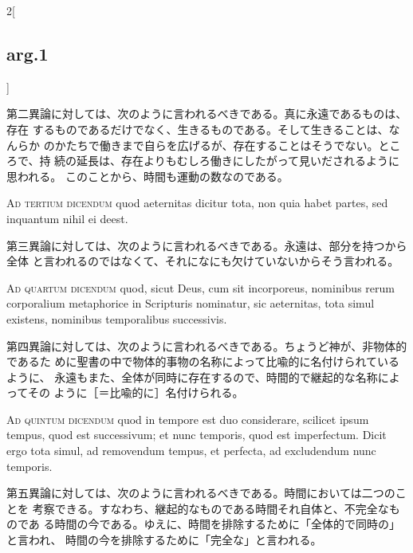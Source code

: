 \documentclass[paper=a4paper,fontsize=10pt,jafontsize=9pt,titlepage]{jlreq}
\begin{document}
\begin{paracol}{2}[\subsection{arg.1}]
\switchcolumn

第二異論に対しては、次のように言われるべきである。真に永遠であるものは、存在
するものであるだけでなく、生きるものである。そして生きることは、なんらか
のかたちで働きまで自らを広げるが、存在することはそうでない。ところで、持
続の延長は、存在よりもむしろ働きにしたがって見いだされるように思われる。
このことから、時間も運動の数なのである。

\switchcolumn*[\subsection{ad.3}]

{\scshape Ad tertium dicendum} quod aeternitas dicitur tota, non quia
habet partes, sed inquantum nihil ei deest.

\switchcolumn

第三異論に対しては、次のように言われるべきである。永遠は、部分を持つから全体
と言われるのではなくて、それになにも欠けていないからそう言われる。

\switchcolumn*[\subsection{ad.4}]

{\scshape Ad quartum dicendum} quod, sicut Deus, cum sit incorporeus,
nominibus rerum corporalium metaphorice in Scripturis nominatur, sic
aeternitas, tota simul existens, nominibus temporalibus successivis.

\switchcolumn

第四異論に対しては、次のように言われるべきである。ちょうど神が、非物体的であるた
めに聖書の中で物体的事物の名称によって比喩的に名付けられているように、
永遠もまた、全体が同時に存在するので、時間的で継起的な名称によってその
ように［＝比喩的に］名付けられる。

\switchcolumn*[\subsection{ad.5}]

{\scshape Ad quintum dicendum} quod in tempore est duo considerare,
scilicet ipsum tempus, quod est successivum; et nunc temporis, quod est
imperfectum. Dicit ergo tota simul, ad removendum tempus, et perfecta,
ad excludendum nunc temporis.

\switchcolumn

第五異論に対しては、次のように言われるべきである。時間においては二つのことを
考察できる。すなわち、継起的なものである時間それ自体と、不完全なものであ
る時間の今である。ゆえに、時間を排除するために「全体的で同時の」と言われ、
時間の今を排除するために「完全な」と言われる。


\end{paracol}
\end{document}
